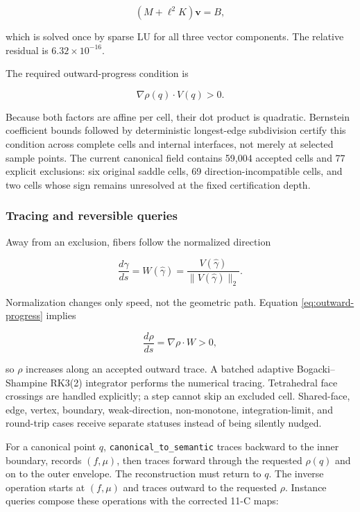 \documentclass[11pt]{article}
\begin{document}
\begin{equation}
  (M+\ell^2K)\mathbf v=B,
\end{equation}

which is solved once by sparse LU for all three vector components. The relative residual
is $6.32\times10^{-16}$.

The required outward-progress condition is

\begin{equation}
  \nabla\rho(q)\cdot V(q)>0.
  \label{eq:outward-progress}
\end{equation}

Because both factors are affine per cell, their dot product is quadratic. Bernstein
coefficient bounds followed by deterministic longest-edge subdivision certify this
condition across complete cells and internal interfaces, not merely at selected sample
points. The current canonical field contains 59,004 accepted cells and 77 explicit
exclusions: six original saddle cells, 69 direction-incompatible cells, and two cells
whose sign remains unresolved at the fixed certification depth.

\subsubsection{Tracing and reversible queries}

Away from an exclusion, fibers follow the normalized direction

\begin{equation}
  \frac{d\widehat\gamma}{ds}
  =W(\widehat\gamma)
  =\frac{V(\widehat\gamma)}{\|V(\widehat\gamma)\|_2}.
  \label{eq:fiber-ode}
\end{equation}

Normalization changes only speed, not the geometric path. Equation
\eqref{eq:outward-progress} implies

\begin{equation}
  \frac{d\rho}{ds}=\nabla\rho\cdot W>0,
\end{equation}

so $\rho$ increases along an accepted outward trace. A batched adaptive Bogacki--Shampine
RK3(2) integrator performs the numerical tracing. Tetrahedral face crossings are handled
explicitly; a step cannot skip an excluded cell. Shared-face, edge, vertex, boundary,
weak-direction, non-monotone, integration-limit, and round-trip cases receive separate
statuses instead of being silently nudged.

For a canonical point $q$, \texttt{canonical\_to\_semantic} traces backward to the inner
boundary, records $(f,\mu)$, then traces forward through the requested $\rho(q)$ and on
to the outer envelope. The reconstruction must return to $q$. The inverse operation
starts at $(f,\mu)$ and traces outward to the requested $\rho$. Instance queries compose
these operations with the corrected 11-C maps:
\end{document}

